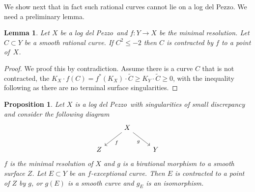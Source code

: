 \documentclass[11pt]{amsbook}
\theoremstyle{plain}
\newtheorem{prop}[thm]{Proposition}
\newtheorem{lem}[thm]{Lemma}
\newcommand{\ldp}{log del Pezzo}
\newcommand{\minres}{minimal resolution}
\newcommand{\wt}[1]{\widetilde #1}
\begin{document}
We show next that in fact such rational curves cannot lie on a \ldp.
We need a preliminary lemma.
\begin{lem}\label{lem!minus2curve}
Let $X$ be a \ldp\ and $f \colon Y \rightarrow X$ be the \minres.
Let $C\subset Y$ be a smooth rational curve. If $C^2\le-2$ then $C$ is contracted by $f$
to a point of~$X$.
\end{lem}

\begin{proof}
We proof this by contradiction. Assume there is a curve $C$ that is not contracted, the $K_X \cdot f(C) = f^*(K_X) \cdot \wt{C} \geq K_Y \cdot \wt{C} \geq 0$, with the inequality following as there are no terminal surface singularities.
\end{proof}

\begin{prop}\label{MainProp}
Let $X$ is a \ldp\ with singularities of small discrepancy and 
consider the following diagram
\[
\begin{tikzcd}
  & X \arrow[rd, "\scriptstyle{g}"'] \arrow[ld, "\scriptstyle{f}"] &   \\
Z &                                                                & Y
\end{tikzcd}
\]
$f$ is the minimal resolution of $X$ and $g$ is a birational morphism to a smooth surface $Z$.
Let $E\subset Y$ be an $f$-exceptional curve. Then $E$ is contracted to a point
of $Z$ by $g$, or $g(E)$ is a smooth curve and $g_E$ is an isomorphism.
\end{prop}
\end{document}
